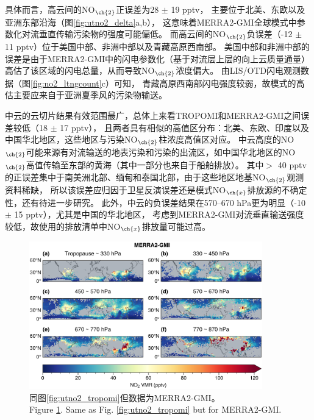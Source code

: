 具体而言，高云间的NO$_{\ch{2}}$正误差为28 $\pm$ 19 pptv，
主要位于北美、东欧以及亚洲东部沿海（图\ref{fig:utno2_delta}a,b），
这意味着MERRA2-GMI全球模式中参数化对流垂直传输污染物的强度可能偏低。
而高云间的NO$_{\ch{2}}$负误差（-12 $\pm$ 11 pptv）位于美国中部、非洲中部以及青藏高原西南部。
美国中部和非洲中部的误差是由于MERRA2-GMI中的闪电参数化（基于对流层上层的向上云质量通量）高估了该区域的闪电总量，从而导致NO$_{\ch{2}}$浓度偏大\citep{Allen.2002,Allen.2010}。
由LIS/OTD闪电观测数据（图\ref{fig:no2_ltngcount}c）可知，
青藏高原西南部闪电强度较弱，故模式的高估主要应来自于亚洲夏季风的污染物输送。

中云的云切片结果有效范围最广，总体上来看TROPOMI和MERRA2-GMI之间误差较低（18 $\pm$ 17 pptv），
且两者具有相似的高值区分布：北美、东欧、印度以及中国华北地区，这些地区与污染NO$_{\ch{2}}$柱浓度高值区对应。
中云高度的NO$_{\ch{2}}$可能来源有对流输送的地表污染和污染的出流区，如中国华北地区的NO$_{\ch{2}}$高值传输至东部的黄海（其中一部分也来自于船舶排放）。
其中$>$ 40 pptv的正误差集中于南美洲北部、缅甸和泰国北部，由于这些地区地基NO$_{\ch{2}}$观测资料稀缺，
所以该误差应归因于卫星反演误差还是模式NO$_{\ch{x}}$排放源的不确定性，还有待进一步研究。
此外，中云的负误差结果在570--670 hPa更为明显（-10 $\pm$ 15 pptv），尤其是中国的华北地区，
考虑到MERRA2-GMI对流垂直输送强度较低，故使用的排放清单中NO$_{\ch{x}}$排放量可能过高\citep{Ziemke.2019}。

\begin{figure}[H]
    \centering
    \includegraphics[width=0.9\textwidth]{./figures/utno2_merra2-gmi.png}
    \caption{
    同图\ref{fig:utno2_tropomi}但数据为MERRA2-GMI。 \\
    Figure \ref{fig:utno2_merra2}. Same as Fig. \ref{fig:utno2_tropomi} but for MERRA2-GMI.
    }
    \label{fig:utno2_merra2}
\end{figure}

